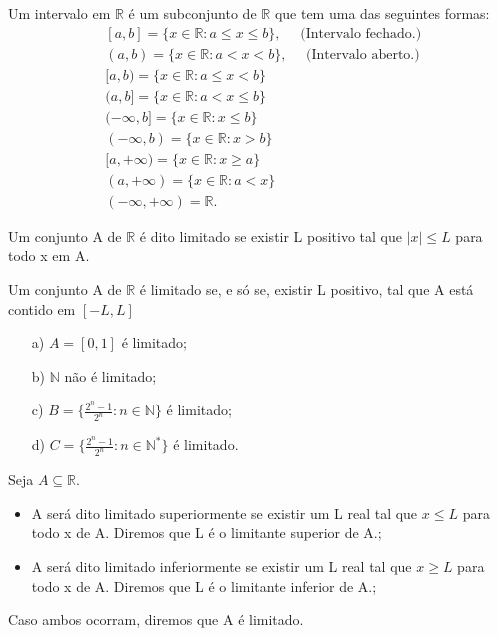 \documentclass[Analysis/analysis_notes.tex]{subfiles}
\begin{document}
\begin{def*}
	Um intervalo em $\mathbb{R}$ \'e um subconjunto de $\mathbb{R}$ que tem uma das seguintes formas:
	\begin{align*}
		 & [a, b] = \{x\in \mathbb{R}: a\leq{x}\leq{b}\},\quad \text{ (Intervalo fechado.) } \\
		 & (a, b) = \{x\in \mathbb{R}: a < x < b\},\quad \text{ (Intervalo aberto.) }        \\
		 & [a, b) = \{x\in \mathbb{R}: a \leq{x} < b\}                                       \\
		 & (a, b] = \{x\in \mathbb{R}: a < x \leq{b}\}                                       \\
		 & (-\infty, b] = \{x\in \mathbb{R}: x\leq{b}\}                                      \\
		 & (-\infty, b) = \{x\in \mathbb{R}: x > b\}                                         \\
		 & [a, +\infty) = \{x\in \mathbb{R}: x\geq{a}\}                                      \\
		 & (a, +\infty) = \{x\in \mathbb{R}: a < x\}                                         \\
		 & (-\infty, +\infty) = \mathbb{R}.
	\end{align*}
\end{def*}
\begin{def*}
	Um conjunto A de $\mathbb{R}$ \'e dito limitado se existir L positivo tal que $|x| \leq L$ para todo x em A.
\end{def*}
\begin{prop*}
	Um conjunto A de $\mathbb{R}$ \'e limitado se, e s\'o se, existir L positivo, tal que A est\'a contido em $[-L, L]$
\end{prop*}
\begin{example}
	\begin{itemize}
		\item[a)] $A = [0, 1]$ \'e limitado;
		\item[b)] $\mathbb{N}$ n\~ao \'e limitado;
		\item[c)] $B = \biggl\{\displaystyle \frac{2^n-1}{2^n}: n\in \mathbb{N}\biggr\}$ \'e limitado;
		\item[d)] $C = \biggl\{\displaystyle \frac{2^n-1}{2^n}: n\in \mathbb{N}^{*}\biggr\}$ \'e limitado.
	\end{itemize}
\end{example}
\begin{def*}
	Seja $A\subseteq{\mathbb{R}}$.
	\begin{itemize}
		\item A ser\'a dito limitado superiormente se existir um L real tal que $x\leq L$ para todo x de A. Diremos que L \'e o limitante superior de A.;
		\item A ser\'a dito limitado inferiormente se existir um L real tal que $x\geq L$ para todo x de A. Diremos que L \'e o limitante inferior de A.;
	\end{itemize}
	Caso ambos ocorram, diremos que A \'e limitado.
\end{def*}
\end{document}
